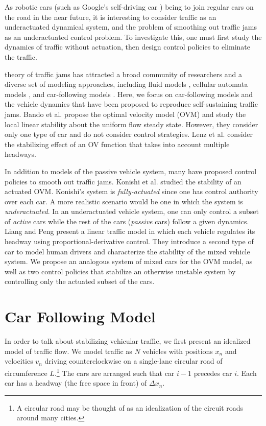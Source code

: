 \documentclass[10pt,twocolumn]{article}
\theoremstyle{ss}
\begin{document}
As robotic cars (such as Google's self-driving car \cite{Thrun}) being to join regular cars on the road in the near future, it is interesting to consider traffic as an underactuated dynamical system, and the problem of smoothing out traffic jams as an underactuated control problem. To investigate this, one must first study the dynamics of traffic without actuation, then design control policies to eliminate the traffic. %

theory of traffic jams has attracted a broad community of researchers and a diverse set of modeling approaches, including fluid models \cite{Kerner}, cellular automata models \cite{Benjaafar}, and car-following models \cite{Bando,Lenz,Liang00,Liang99,Yanakiev}. Here, we focus on car-following models and the vehicle dynamics that have been proposed to reproduce self-sustaining traffic jams. Bando et al. \cite{Bando} propose the optimal velocity model (OVM) and study the local linear stability about the uniform flow steady state. However, they consider only one type of car and do not consider control strategies. Lenz et al. \cite{Lenz} consider the stabilizing effect of an OV function that takes into account multiple headways.

In addition to models of the passive vehicle system, many have proposed control policies to smooth out traffic jams. Konishi et al. \cite{Konishi} studied the stability of an actuated OVM. Konishi's system is {\em fully-actuated} since one has control authority over each car. A more realistic scenario would be one in which the system is {\em underactuated}. In an underactuated vehicle system, one can only control a subset of {\em active} cars while the rest of the cars ({\em passive} cars) follow a given dynamics. Liang and Peng \cite{Liang00,Liang99} present a linear traffic model in which each vehicle regulates its headway using proportional-derivative control. They introduce a second type of car to model human drivers and characterize the stability of the mixed vehicle system. We propose an analogous system of mixed cars for the OVM model, as well as two control policies that stabilize an otherwise unstable system by controlling only the actuated subset of the cars.

\section{Car Following Model}
In order to talk about stabilizing vehicular traffic, we first present an idealized model of traffic flow. We model traffic as $N$ vehicles with positions $x_n$ and velocities $v_n$ driving counterclockwise on a single-lane circular road of circumference $L$.\footnote{A circular road may be thought of as an idealization of the circuit roads around many cities.} The cars are arranged such that car $i-1$ precedes car $i$. Each car has a headway (the free space in front) of $\Delta x_n$.
\end{document}

